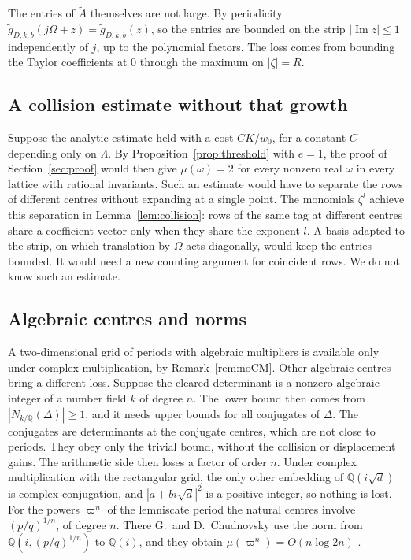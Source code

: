 \documentclass[11pt]{amsart}
\theoremstyle{definition}
\theoremstyle{remark}
\numberwithin{equation}{section}
\newcommand{\Q}{\mathbb Q}
\newcommand{\tg}{\widetilde g}
\newcommand{\tA}{\widetilde A}
\begin{document}
The entries of $\tA$ themselves are not large. By periodicity $\tg_{D,k,b}(j\Omega+z)=\tg_{D,k,b}(z)$, so
the entries are bounded on the strip $|\operatorname{Im}z|\le1$ independently of $j$, up to the polynomial
factors. The loss comes from bounding the Taylor coefficients at $0$ through the maximum on $|\zeta|=R$.

\subsection{A collision estimate without that growth}
Suppose the analytic estimate held with a cost $CK/w_0$, for a constant $C$ depending only on $\Lambda$. By
Proposition~\ref{prop:threshold} with $e=1$, the proof of Section~\ref{sec:proof} would then give
$\mu(\omega)=2$ for every nonzero real $\omega$ in every lattice with rational invariants. Such an estimate
would have to separate the rows of different centres without expanding at a single point. The monomials
$\zeta^l$ achieve this separation in Lemma~\ref{lem:collision}: rows of the same tag at different centres share
a coefficient vector only when they share the exponent $l$. A basis adapted to the strip, on which translation by
$\Omega$ acts diagonally, would keep the entries bounded. It would need a new counting argument for coincident
rows. We do not know such an estimate.

\subsection{Algebraic centres and norms}
A two-dimensional grid of periods with algebraic multipliers is available only under complex multiplication,
by Remark~\ref{rem:noCM}. Other algebraic centres bring a different loss. Suppose the cleared determinant is a
nonzero algebraic integer of a number field $k$ of degree $n$. The lower bound then comes from
$|N_{k/\Q}(\Delta)|\ge1$, and it needs upper bounds for all conjugates of $\Delta$. The conjugates are
determinants at the conjugate centres, which are not close to periods. They obey only the trivial bound, without
the collision or displacement gains. The arithmetic side then loses a factor of order $n$. Under complex
multiplication with the rectangular grid, the only other embedding of $\Q(i\sqrt d)$ is complex conjugation,
and $|a+bi\sqrt d|^2$ is a positive integer, so nothing is lost. For the powers $\varpi^n$ of the lemniscate
period the natural centres involve $(p/q)^{1/n}$, of degree $n$. There G.~and D.~Chudnovsky use the norm from
$\Q(i,(p/q)^{1/n})$ to $\Q(i)$, and they obtain $\mu(\varpi^n)=O(n\log2n)$ \cite[Theorem~18.1]{ChudnovskyChudnovsky26}.
\end{document}
